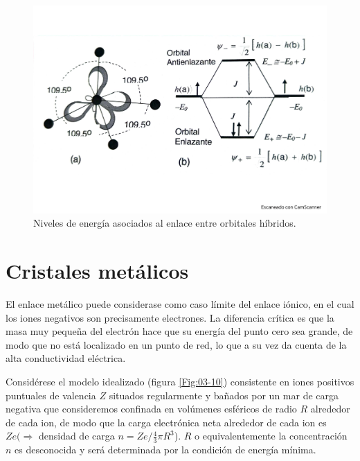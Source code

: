 \begin{figure}[h!] \centering
    \includegraphics[scale=0.4]{Cuerpo/Ch_03/Fotos libro 8.pdf}
    \caption{Niveles de energía asociados al enlace entre orbitales híbridos.}
    \label{Fig:03-09}
\end{figure}    

\section{Cristales metálicos}

El enlace metálico puede considerase como caso límite del enlace iónico, en el cual los iones negativos son precisamente electrones. La diferencia crítica es que la masa muy pequeña del electrón hace que su energía del punto cero sea grande, de modo que no está localizado en un punto de red, lo que a su vez da cuenta de la alta conductividad eléctrica. 

Considérese el modelo idealizado (figura \ref{Fig:03-10}) consistente en iones positivos puntuales de valencia $Z$ situados regularmente y bañados por un mar de carga negativa que consideremos confinada en volúmenes esféricos de radio $R$ alrededor de cada ion, de modo que la carga electrónica neta alrededor de cada ion es $Ze(\Rightarrow$ densidad de carga $n=Ze/\frac{4}{3}\pi R^3$). $R$ o equivalentemente la concentración $n$ es desconocida y será determinada por la condición de energía mínima. 


